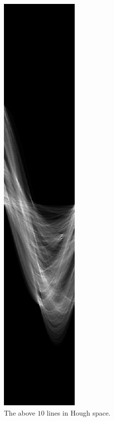     \begin{figure}[H]
      \centering
      \includegraphics[scale=0.8]{./images/Q8/godthem256/2.png}
      \caption{The above $10$ lines in Hough space.}
      \label{fig:Q8_godthem256_2}
    \end{figure}

